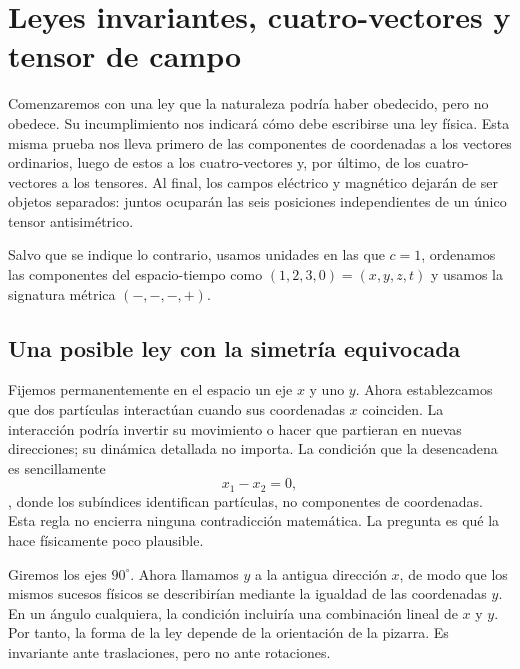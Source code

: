 \chapter{Leyes invariantes, cuatro-vectores y tensor de campo}

Comenzaremos con una ley que la naturaleza podría haber obedecido, pero no obedece. Su incumplimiento nos indicará cómo debe escribirse una ley física. Esta misma prueba nos lleva primero de las componentes de coordenadas a los vectores ordinarios, luego de estos a los cuatro-vectores y, por último, de los cuatro-vectores a los tensores. Al final, los campos eléctrico y magnético dejarán de ser objetos separados: juntos ocuparán las seis posiciones independientes de un único tensor antisimétrico.

Salvo que se indique lo contrario, usamos unidades en las que \(c=1\), ordenamos las componentes del espacio-tiempo como \((1,2,3,0)=(x,y,z,t)\) y usamos la signatura métrica \((-,-,-,+)\).

\section{Una posible ley con la simetría equivocada}

Fijemos permanentemente en el espacio un eje \(x\) y uno \(y\). Ahora establezcamos que dos partículas interactúan cuando sus coordenadas \(x\) coinciden. La interacción podría invertir su movimiento o hacer que partieran en nuevas direcciones; su dinámica detallada no importa. La condición que la desencadena es sencillamente \begin{equation}
  x_1-x_2=0,
\end{equation}, donde los subíndices identifican partículas, no componentes de coordenadas. Esta regla no encierra ninguna contradicción matemática. La pregunta es qué la hace físicamente poco plausible.

\begin{classroomqa}\end{classroomqa}

Giremos los ejes \(90^\circ\). Ahora llamamos \(y\) a la antigua dirección \(x\), de modo que los mismos sucesos físicos se describirían mediante la igualdad de las coordenadas \(y\). En un ángulo cualquiera, la condición incluiría una combinación lineal de \(x\) y \(y\). Por tanto, la forma de la ley depende de la orientación de la pizarra. Es invariante ante traslaciones, pero no ante rotaciones.


